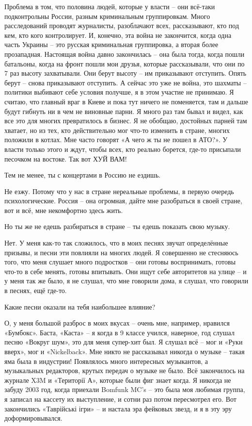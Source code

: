 Проблема в том, что половина людей, которые у власти – они всё-таки
подконтрольны России, разным криминальным группировкам. Много расследований
проводят журналисты, разоблачают всех, рассказывают, кто под кем, кто кого
контролирует. И, конечно, эта война не закончится, когда одна часть Украины –
это русская криминальная группировка, а вторая более прозападная. Настоящая
война давно закончилась – она была тогда, когда пошли батальоны, когда на фронт
пошли мои друзья, которые рассказывали, что они по 7 раз высоту захватывали.
Они берут высоту – им приказывают отступить. Опять берут – снова приказывают
отступить. А сейчас это уже не война, это шахматы – политики выбивают себе
условия получше, я в этом участие не принимаю. Я считаю, что главный враг в
Киеве и пока тут ничего не поменяется, там и дальше будут гибнуть ни в чем не
виновные парни. Я много раз там бывал и видел, как все это для многих
превратилось в бизнес. Я не обобщаю, достойных парней там хватает, но из тех,
кто действительно мог что-то изменить в стране, многих положили в котлах. Мне
часто говорят «А чего ж ты не пошел в АТО?».  У власти только этого и ждут,
чтобы всех, кто реально борется, где-то присыпали песочком на востоке. Так вот
ХУЙ ВАМ!

Тем не менее, ты с концертами в Россию не ездишь.

Не езжу. Потому что у нас в стране нереальные проблемы, в первую очередь
психологические. Россия – она огромная, дайте мне разобраться в своей стране,
вот и всё, мне некомфортно здесь жить.

Но ты же не едешь разбираться в стране – ты едешь показать свою музыку.

Нет. У меня как-то так сложилось, что в моих песнях звучат определённые
призывы,  и песни эти повлияли на многих людей. Я совершенно не стесняюсь того,
что меня слушает много подростков – они готовы воспринимать, готовы что-то в
себе менять, готовы впитывать. Они ищут себе авторитетов на улице – и у меня
так же было, я не слушал, что мне говорили дома, я слушал, что говорили в
песнях, ещё где-то.

Какие песни оказали на тебя наибольшее влияние?

О, у меня большой разброс в моих вкусах – очень мне, например, нравился «Бумбокс». Баста, «Каста» – я когда в 9 классе учился, наверное, год слушал песню «Вокруг шум», это для меня супер-хит был. Я слушал всё – мог и «Руки вверх», мог и «Nickelback».  Мне никто не рассказывал никогда о музыке – такая яма была в индустрии! Появлялось много интересных музыкантов, а музыкальных редакторов, крутых передач о музыке не было. Всё закончилось на журнале X3M и «Території А», которые были фиг знает когда. Я никогда не забуду 2003 год, когда приехали Bomfunk MC’s – это была моя любимая группа, я записал на кассету их выступление, и сотни раз потом пересмотрел его. Вот закончились «Таврійські ігри» – и настала эра фейковых звезд, и я в эту эру доформировывался.

